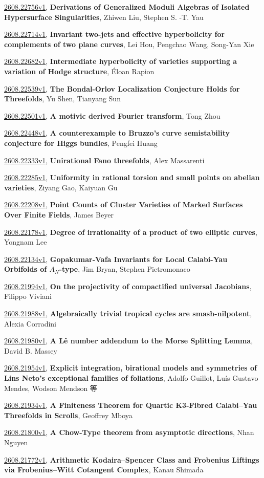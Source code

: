 \documentclass[9pt, a4paper]{article}
\theoremstyle{plain}
\theoremstyle{definition}
\theoremstyle{remark}
\newcommand{\arxiv}[3]{\href{https://arxiv.org/abs/#1}{#1}, \textbf{\textcolor{arxivblue}{#2}}, #3}
\begin{document}
\arxiv{2608.22756v1}{Derivations of Generalized Moduli Algebras of Isolated Hypersurface Singularities}{Zhiwen Liu, Stephen S. -T. Yau}

\arxiv{2608.22714v1}{Invariant two-jets and effective hyperbolicity for complements of two plane curves}{Lei Hou, Pengchao Wang, Song-Yan Xie}

\arxiv{2608.22682v1}{Intermediate hyperbolicity of varieties supporting a variation of Hodge structure}{Éloan Rapion}

\arxiv{2608.22539v1}{The Bondal-Orlov Localization Conjecture Holds for Threefolds}{Yu Shen, Tianyang Sun}

\arxiv{2608.22501v1}{A motivic derived Fourier transform}{Tong Zhou}

\arxiv{2608.22448v1}{A counterexample to Bruzzo's curve semistability conjecture for Higgs bundles}{Pengfei Huang}

\arxiv{2608.22333v1}{Unirational Fano threefolds}{Alex Massarenti}

\arxiv{2608.22285v1}{Uniformity in rational torsion and small points on abelian varieties}{Ziyang Gao, Kaiyuan Gu}

\arxiv{2608.22208v1}{Point Counts of Cluster Varieties of Marked Surfaces Over Finite Fields}{James Beyer}

\arxiv{2608.22178v1}{Degree of irrationality of a product of two elliptic curves}{Yongnam Lee}

\arxiv{2608.22134v1}{Gopakumar-Vafa Invariants for Local Calabi-Yau Orbifolds of $A_{N}$-type}{Jim Bryan, Stephen Pietromonaco}

\arxiv{2608.21994v1}{On the projectivity of compactified universal Jacobians}{Filippo Viviani}

\arxiv{2608.21988v1}{Algebraically trivial tropical cycles are smash-nilpotent}{Alexia Corradini}

\arxiv{2608.21980v1}{A Lê number addendum to the Morse Splitting Lemma}{David B. Massey}

\arxiv{2608.21954v1}{Explicit integration, birational models and symmetries of Lins Neto's exceptional families of foliations}{Adolfo Guillot, Luís Gustavo Mendes, Wodson Mendson 等}

\arxiv{2608.21934v1}{A Finiteness Theorem for Quartic K3-Fibred Calabi--Yau Threefolds in Scrolls}{Geoffrey Mboya}

\arxiv{2608.21800v1}{A Chow-Type theorem from asymptotic directions}{Nhan Nguyen}

\arxiv{2608.21772v1}{Arithmetic Kodaira--Spencer Class and Frobenius Liftings via Frobenius--Witt Cotangent Complex}{Kanau Shimada}
\end{document}
